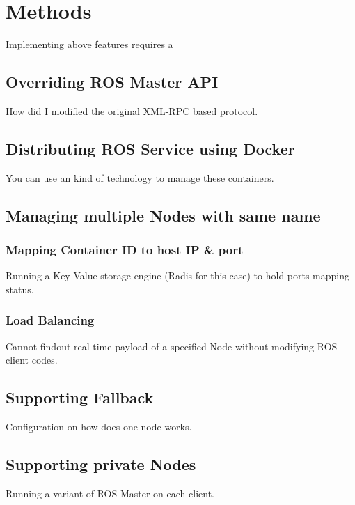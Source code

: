 \section{Methods}

Implementing above features requires a 
 
\subsection{Overriding ROS Master API}
How did I modified the original XML-RPC based protocol.

\subsection{Distributing ROS Service using Docker}
You can use an kind of technology to manage these containers.

\subsection{Managing multiple Nodes with same name}
\subsubsection{Mapping Container ID to host IP \& port}
Running a Key-Value storage engine (Radis for this case) to hold ports mapping status.

\subsubsection{Load Balancing}
Cannot findout real-time payload of a specified Node without modifying ROS client codes.

\subsection{Supporting Fallback}
Configuration on how does one node works. 

\subsection{Supporting private Nodes}
Running a variant of ROS Master on each client.


